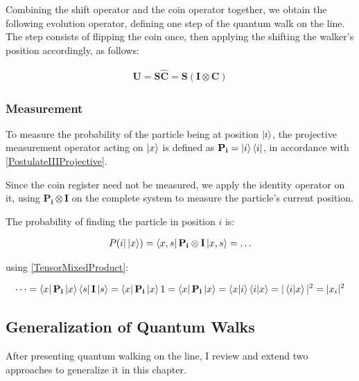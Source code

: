 
Combining the shift operator and the coin operator together, we obtain the following evolution operator, defining one step of the quantum walk on the line. The step consists of flipping the coin once, then applying the shifting the walker's position accordingly, as follows:

\begin{align*}
    \mathbf{U} = \mathbf{S}\mathbf{\hat{C}} = \mathbf{S}(\mathbf{I}\otimes{}\mathbf{C})
\end{align*}

\subsubsection{Measurement}

To measure the probability of the particle being at position $\ket{i}$, the projective measurement operator acting on $\ket{x}$ is defined as $\mathbf{P_i} = \ket{i}\bra{i}$, in accordance with \hyperref[PostulateIIIProjective]{[PostulateIIIProjective]}.

Since the coin register need not be measured, we apply the identity operator on it, using $\mathbf{P_i} \otimes \mathbf{I}$ on the complete system to measure the particle's current position.

The probability of finding the particle in position $i$ is:

\begin{gather*}
    P(i | \ket{x}) = \bra{x,s}\mathbf{P_i}\otimes{}\mathbf{I}\ket{x,s} = \dots
\end{gather*}

using \hyperref[TensorMixedProduct]{[TensorMixedProduct]}:

\begin{gather*}
    \dots = \bra{x}\mathbf{P_i}\ket{x}\bra{s}\mathbf{I}\ket{s} =
    \bra{x}\mathbf{P_i}\ket{x}1 =
    \bra{x}\mathbf{P_i}\ket{x} =
    \bra{x}\ket{i}\bra{i}\ket{x} =
    |\bra{i}\ket{x}|^2 =
    |x_i|^2
\end{gather*}

\subsection{Generalization of Quantum Walks}

After presenting quantum walking on the line, I review and extend two approaches to generalize it in this chapter.

